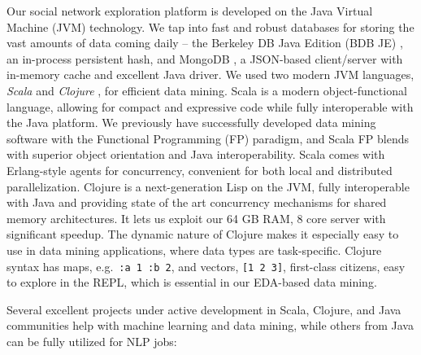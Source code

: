 \documentclass[10pt,oneside]{memoir}
\begin{document}
\label{impl:Clojure}


Our social network exploration platform is developed on the Java Virtual Machine (JVM) technology. We tap into fast and robust databases for storing the vast amounts of data coming daily -- the Berkeley DB Java Edition (BDB JE) \cite{code:berkeleydb}, an in-process persistent hash, and MongoDB \cite{code:mongodb}, a JSON-based client/server with in-memory cache and excellent Java driver. We used two modern JVM languages, {\itshape Scala} \cite{code:scala} and {\itshape Clojure} \cite{code:clojure}, for efficient data mining. Scala is a modern object-functional language, allowing for compact and expressive code while fully interoperable with the Java platform. We previously have successfully developed data mining software with the Functional Programming (FP) paradigm, and Scala FP blends with superior object orientation and Java interoperability.  Scala comes with Erlang-style agents for concurrency, convenient for both local and distributed parallelization.  Clojure is a next-generation Lisp on the JVM, fully interoperable with Java and providing state of the art concurrency mechanisms for shared memory architectures.  It lets us exploit our 64 GB RAM, 8 core server with significant speedup.  The dynamic nature of Clojure makes it especially easy to use in data mining applications, where data types are task-specific.  Clojure syntax has maps, e.g.\ \texttt{{:a 1 :b 2}}, and vectors, \texttt{[1 2 3]}, first-class citizens, easy to explore in the REPL, which is essential in our EDA-based data mining.


Several excellent projects under active development in Scala, Clojure, and Java communities help with machine learning and data mining, while others from Java can be fully utilized for NLP jobs:
\end{document}
